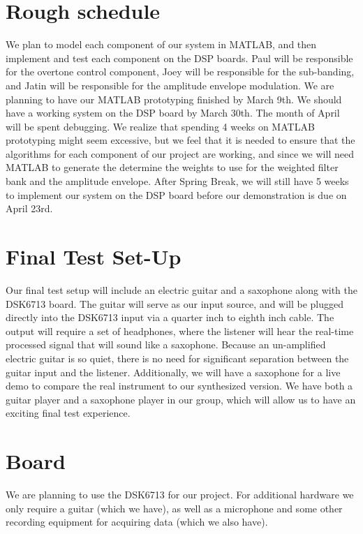 \documentclass{article}
\begin{document}
\section{Rough schedule}
We plan to model each component of our system in MATLAB, and then implement and test each component on the DSP boards. Paul will be responsible for the overtone control component, Joey will be responsible for the sub-banding, and Jatin will be responsible for the amplitude envelope modulation.
\newline
\newline
We are planning to have our MATLAB prototyping finished by March 9th. We should have a working system on the DSP board by March 30th. The month of April will be spent debugging. We realize that spending 4 weeks on MATLAB prototyping might seem excessive, but we feel that it is needed to ensure that the algorithms for each component of our project are working, and since we will need MATLAB to generate the determine the weights to use for the weighted filter bank and the amplitude envelope. After Spring Break, we will still have 5 weeks to implement our system on the DSP board before our demonstration is due on April 23rd.

\section{Final Test Set-Up}
Our final test setup will include an electric guitar and a saxophone along with the DSK6713 board. The guitar will serve as our input source, and will be plugged directly into the DSK6713 input via a quarter inch to eighth inch cable. The output will require a set of headphones, where the listener will hear the real-time processed signal that will sound like a saxophone. Because an un-amplified electric guitar is so quiet, there is no need for significant separation between the guitar input and the listener. Additionally, we will have a saxophone for a live demo to compare the real instrument to our synthesized version. We have both a guitar player and a saxophone player in our group, which will allow us to have an exciting final test experience.

\section{Board}
We are planning to use the DSK6713 for our project. For additional hardware we only require a guitar (which we have), as well as a microphone and some other recording equipment for acquiring data (which we also have).
 


\end{document}
